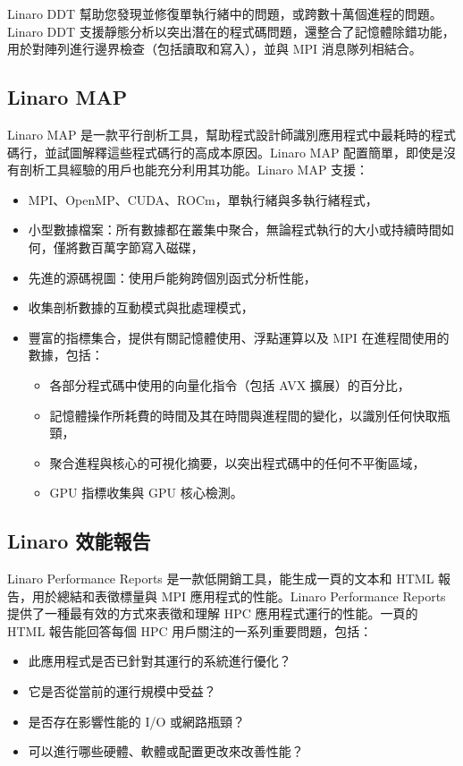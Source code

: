 Linaro DDT 幫助您發現並修復單執行緒中的問題，或跨數十萬個進程的問題。Linaro DDT 支援靜態分析以突出潛在的程式碼問題，還整合了記憶體除錯功能，用於對陣列進行邊界檢查（包括讀取和寫入），並與 MPI 消息隊列相結合。

\subsection{Linaro MAP}

Linaro MAP 是一款平行剖析工具，幫助程式設計師識別應用程式中最耗時的程式碼行，並試圖解釋這些程式碼行的高成本原因。Linaro MAP 配置簡單，即使是沒有剖析工具經驗的用戶也能充分利用其功能。Linaro MAP 支援：

\begin{itemize}
    \item MPI、OpenMP、CUDA、ROCm，單執行緒與多執行緒程式，
    \item 小型數據檔案：所有數據都在叢集中聚合，無論程式執行的大小或持續時間如何，僅將數百萬字節寫入磁碟，
    \item 先進的源碼視圖：使用戶能夠跨個別函式分析性能，
    \item 收集剖析數據的互動模式與批處理模式，
    \item 豐富的指標集合，提供有關記憶體使用、浮點運算以及 MPI 在進程間使用的數據，包括：
    \begin{itemize}
        \item 各部分程式碼中使用的向量化指令（包括 AVX 擴展）的百分比，
        \item 記憶體操作所耗費的時間及其在時間與進程間的變化，以識別任何快取瓶頸，
        \item 聚合進程與核心的可視化摘要，以突出程式碼中的任何不平衡區域，
        \item GPU 指標收集與 GPU 核心檢測。
    \end{itemize}
\end{itemize}

\subsection{Linaro 效能報告}

Linaro Performance Reports 是一款低開銷工具，能生成一頁的文本和 HTML 報告，用於總結和表徵標量與 MPI 應用程式的性能。Linaro Performance Reports 提供了一種最有效的方式來表徵和理解 HPC 應用程式運行的性能。一頁的 HTML 報告能回答每個 HPC 用戶關注的一系列重要問題，包括：


\begin{itemize}
    \item 此應用程式是否已針對其運行的系統進行優化？
    \item 它是否從當前的運行規模中受益？
    \item 是否存在影響性能的 I/O 或網路瓶頸？
    \item 可以進行哪些硬體、軟體或配置更改來改善性能？
\end{itemize}

